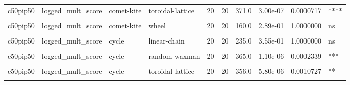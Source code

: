 \documentclass[
]{book}
\begin{document}
\begin{table}
\begin{tabular}{l|l|l|l|r|r|r|r|r|l}
\hline
\cellcolor{gray!6}{c50pip50} & \cellcolor{gray!6}{logged\_mult\_score} & \cellcolor{gray!6}{comet-kite} & \cellcolor{gray!6}{star} & \cellcolor{gray!6}{20} & \cellcolor{gray!6}{20} & \cellcolor{gray!6}{285.0} & \cellcolor{gray!6}{2.10e-02} & \cellcolor{gray!6}{1.0000000} & \cellcolor{gray!6}{ns}\\
\hline
c50pip50 & logged\_mult\_score & comet-kite & toroidal-lattice & 20 & 20 & 371.0 & 3.00e-07 & 0.0000717 & ****\\
\hline
\cellcolor{gray!6}{c50pip50} & \cellcolor{gray!6}{logged\_mult\_score} & \cellcolor{gray!6}{comet-kite} & \cellcolor{gray!6}{well-mixed} & \cellcolor{gray!6}{20} & \cellcolor{gray!6}{20} & \cellcolor{gray!6}{400.0} & \cellcolor{gray!6}{0.00e+00} & \cellcolor{gray!6}{0.0000000} & \cellcolor{gray!6}{****}\\
\hline
c50pip50 & logged\_mult\_score & comet-kite & wheel & 20 & 20 & 160.0 & 2.89e-01 & 1.0000000 & ns\\
\hline
\cellcolor{gray!6}{c50pip50} & \cellcolor{gray!6}{logged\_mult\_score} & \cellcolor{gray!6}{comet-kite} & \cellcolor{gray!6}{windmill} & \cellcolor{gray!6}{20} & \cellcolor{gray!6}{20} & \cellcolor{gray!6}{398.0} & \cellcolor{gray!6}{0.00e+00} & \cellcolor{gray!6}{0.0000000} & \cellcolor{gray!6}{****}\\
\hline
c50pip50 & logged\_mult\_score & cycle & linear-chain & 20 & 20 & 235.0 & 3.55e-01 & 1.0000000 & ns\\
\hline
\cellcolor{gray!6}{c50pip50} & \cellcolor{gray!6}{logged\_mult\_score} & \cellcolor{gray!6}{cycle} & \cellcolor{gray!6}{random-barabasi-albert} & \cellcolor{gray!6}{20} & \cellcolor{gray!6}{20} & \cellcolor{gray!6}{400.0} & \cellcolor{gray!6}{0.00e+00} & \cellcolor{gray!6}{0.0000000} & \cellcolor{gray!6}{****}\\
\hline
c50pip50 & logged\_mult\_score & cycle & random-waxman & 20 & 20 & 365.0 & 1.10e-06 & 0.0002339 & ***\\
\hline
\cellcolor{gray!6}{c50pip50} & \cellcolor{gray!6}{logged\_mult\_score} & \cellcolor{gray!6}{cycle} & \cellcolor{gray!6}{star} & \cellcolor{gray!6}{20} & \cellcolor{gray!6}{20} & \cellcolor{gray!6}{273.0} & \cellcolor{gray!6}{4.90e-02} & \cellcolor{gray!6}{1.0000000} & \cellcolor{gray!6}{ns}\\
\hline
c50pip50 & logged\_mult\_score & cycle & toroidal-lattice & 20 & 20 & 356.0 & 5.80e-06 & 0.0010727 & **\\
\hline
\cellcolor{gray!6}{c50pip50} & \cellcolor{gray!6}{logged\_mult\_score} & \cellcolor{gray!6}{cycle} & \cellcolor{gray!6}{well-mixed} & \cellcolor{gray!6}{20} & \cellcolor{gray!6}{20} & \cellcolor{gray!6}{400.0} & \cellcolor{gray!6}{0.00e+00} & \cellcolor{gray!6}{0.0000000} & \cellcolor{gray!6}{****}\\

\end{tabular}
\end{table}
\end{document}
